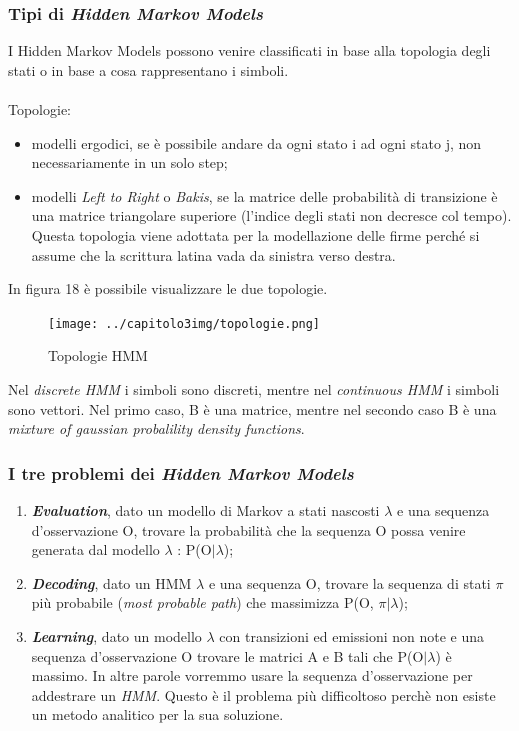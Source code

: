 \subsubsection*{Tipi di \emph{Hidden Markov Models}}
\label{3.3.2.4}
I Hidden Markov Models possono venire classificati in base alla topologia degli stati o in base a cosa rappresentano i simboli.\\\\
Topologie:
\begin{itemize}
\item modelli ergodici, se è possibile andare da ogni stato i ad ogni stato j, non necessariamente in un solo step;
\item modelli \emph{Left to Right} o \emph{Bakis}, se la matrice delle probabilità di transizione è una matrice triangolare superiore (l'indice degli stati non decresce col tempo). Questa topologia viene adottata per la modellazione delle firme perché si assume che la scrittura latina vada da sinistra verso destra.
\end{itemize}
In figura 18 è possibile visualizzare le due topologie.
\begin{figure}[H]
\centering
\texttt{[image: ../capitolo3img/topologie.png]}
\caption{Topologie HMM}
\end{figure}
Nel \emph{discrete HMM} i simboli sono discreti, mentre nel \emph{continuous HMM} i simboli sono vettori. Nel primo caso, B è una matrice, mentre nel secondo caso B è una \emph{mixture of gaussian probalility density functions}.

\subsubsection*{I tre problemi dei \emph{Hidden Markov Models}\cite{8}}
\label{3.3.2.5}
\begin{enumerate}
\item\textbf{\emph{Evaluation}}, dato un modello di Markov a stati nascosti $\lambda$ e una sequenza d'osservazione O, trovare la probabilità che la sequenza O possa venire generata dal modello $\lambda$ : P(O$|\lambda$);
\item\textbf{\emph{Decoding}}, dato un HMM $\lambda$ e una sequenza O, trovare la sequenza di stati $\pi$ più probabile (\emph{most probable path}) che massimizza P(O, $\pi$$|\lambda$);
\item\textbf{\emph{Learning}}, dato un modello $\lambda$ con transizioni ed emissioni non note e una sequenza d'osservazione O trovare le matrici A e B tali che P(O$|\lambda$) è massimo. In altre parole vorremmo usare la sequenza d'osservazione per addestrare un \emph{HMM}. Questo è il problema più difficoltoso perchè non esiste un metodo analitico per la sua soluzione.
\end{enumerate}

